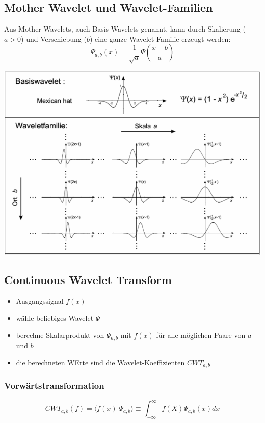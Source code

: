 \documentclass[10pt]{article}
\begin{document}
\subsection{Mother Wavelet und Wavelet-Familien}
Aus Mother Wavelets, auch Basis-Wavelets genannt, kann durch Skalierung ($a > 0$) und Verschiebung ($b$) eine ganze Wavelet-Familie erzeugt werden:
 \begin{equation*}
	\Psi_{a,b}(x)= \frac{1}{\sqrt{a}} \Psi \left(\frac{x-b}{a} \right)
\end{equation*}
\begin{center}
	\includegraphics[scale=0.4]{wavelet-family.png}
\end{center}

\subsection{Continuous Wavelet Transform}
\begin{itemize}
	\item Ausgangssignal $f(x)$
	\item wähle beliebiges Wavelet $\Psi$
	\item berechne Skalarprodukt von $\Psi_{a,b}$ mit $f(x)$ für alle möglichen Paare von $a$ und $b$
	\item die berechneten WErte sind die Wavelet-Koeffizienten $CWT_{a,b}$
\end{itemize}
\subsubsection*{Vorwärtstransformation}
 \begin{equation*}
	CWT_{a,b}(f)=\langle f(x) | \Psi_{a,b} \rangle \equiv \int_{-\infty}^\infty f(X) \overline{\Psi_{a,b}(x)} dx
\end{equation*}
\end{document}
